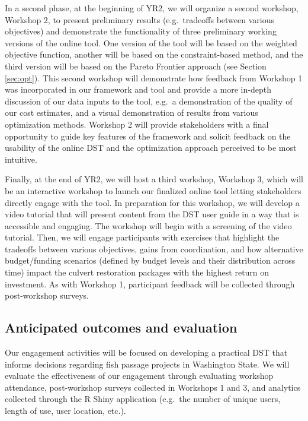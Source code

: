 \documentclass[12pt]{elsarticle}
\begin{document}
In a second phase, at the beginning of YR2, we will organize a second workshop, Workshop 2, to present preliminary results (e.g.\ tradeoffs between various objectives) and demonstrate the functionality of three preliminary working versions of the online tool. One version of the tool will be based on the weighted objective function, another will be based on the constraint-based method, and the third version will be based on the Pareto Frontier approach (see Section \ref{sec:opt}). This second workshop will demonstrate how feedback from Workshop 1 was incorporated in our framework and tool and provide a more in-depth discussion of our data inputs to the tool, e.g.\ a demonstration of the quality of our cost estimates, and a visual demonstration of results from various optimization methods. Workshop 2 will provide stakeholders with a final opportunity to guide key features of the framework and solicit feedback on the usability of the online DST and the optimization approach perceived to be most intuitive. 

Finally, at the end of YR2, we will host a third workshop, Workshop 3, which will be an interactive workshop to launch our finalized online tool letting stakeholders directly engage with the tool. In preparation for this workshop, we will develop a video tutorial that will present content from the DST user guide in a way that is accessible and engaging. The workshop will begin with a screening of the video tutorial. Then, we will engage participants with exercises that highlight the tradeoffs between various objectives, gains from coordination, and how alternative budget/funding scenarios (defined by budget levels and their distribution across time) impact the culvert restoration packages with the highest return on investment. As with Workshop 1, participant feedback will be collected through post-workshop surveys.

\subsection*{Anticipated outcomes and evaluation}

Our engagement activities will be focused on developing a practical DST that informs decisions regarding fish passage projects in Washington State. We will evaluate the effectiveness of our engagement through evaluating workshop attendance, post-workshop surveys collected in Workshops 1 and 3, and analytics collected through the R Shiny application (e.g.\ the number of unique users, length of use, user location, etc.).
\end{document}
